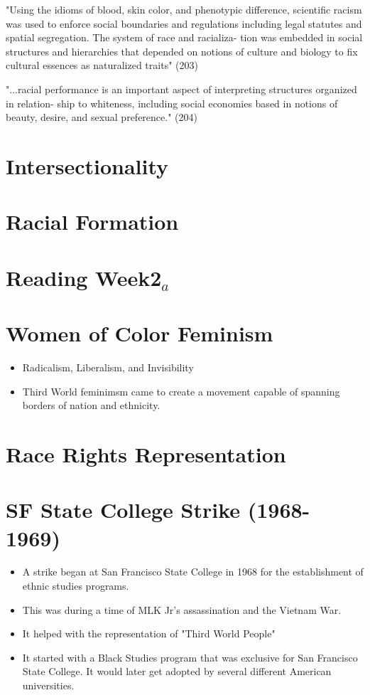\documentclass{article}
\begin{document}
"Using the idioms of blood, skin color, and phenotypic
difference, scientific racism was used to enforce social
boundaries and regulations including legal statutes and
spatial segregation. The system of race and racializa-
tion was embedded in social structures and hierarchies
that depended on notions of culture and biology to fix
cultural essences as naturalized traits" (203)

"...racial performance is an important
aspect of interpreting structures organized in relation-
ship to whiteness, including social economies based in
notions of beauty, desire, and sexual preference." (204)



\section{Intersectionality}

\section{Racial Formation}

\section*{Reading Week2$_{a}$}

\section{Women of Color Feminism}
\begin{itemize}
  \item Radicalism, Liberalism, and Invisibility
  \item Third World feminimsm came to create a movement 
    capable of spanning borders of nation and ethnicity.
\end{itemize}

\section{Race Rights Representation}

\section{SF State College Strike (1968-1969)}
\begin{itemize}
  \item A strike began at San Francisco State College in 1968
    for the establishment of ethnic studies programs.
  \item This was during a time of MLK Jr's assassination and the Vietnam War.
  \item It helped with the representation of "Third World People"
  \item It started with a Black Studies program that
    was exclusive for San Francisco State College.
    It would later get adopted by several different American universities.
\end{itemize}
  
\end{document}
